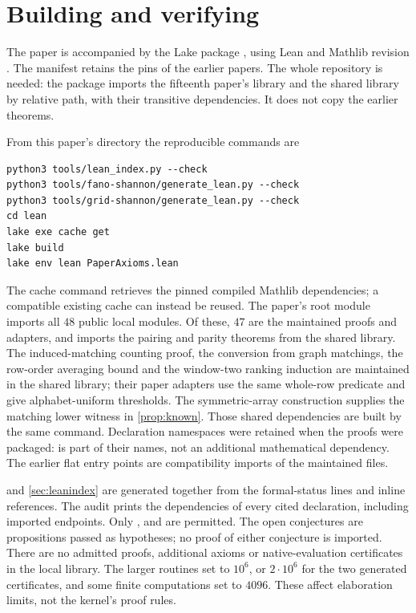 \section{Building and verifying}\label{sec:verification}

The paper is accompanied by the Lake package , using Lean
 and Mathlib revision
. The manifest retains the pins of the earlier papers. The whole
repository is needed: the package imports the fifteenth paper's library and the shared 
library by relative path, with their transitive dependencies. It does not copy the earlier theorems.

From this paper's directory the reproducible commands are
\begin{verbatim}
python3 tools/lean_index.py --check
python3 tools/fano-shannon/generate_lean.py --check
python3 tools/grid-shannon/generate_lean.py --check
cd lean
lake exe cache get
lake build
lake env lean PaperAxioms.lean
\end{verbatim}
The cache command retrieves the pinned compiled Mathlib dependencies; a compatible existing cache can instead be
reused. The paper's root module imports all $48$ public local modules. Of these, $47$ are the maintained proofs and
adapters, and  imports the pairing and parity theorems from the shared library.
The induced-matching counting proof, the conversion from graph matchings, the row-order averaging bound and
the window-two ranking induction are maintained in the shared library; their paper adapters use the same
whole-row predicate and give alphabet-uniform thresholds. The symmetric-array construction supplies the matching
lower witness in \cref{prop:known}. Those shared dependencies are built by the same command. Declaration namespaces were retained when the proofs were
packaged:  is part of their names, not an additional mathematical dependency. The earlier flat
entry points are compatibility imports of the maintained files.

 and \cref{sec:leanindex} are generated together from the formal-status lines and inline
references. The audit prints the dependencies of every cited declaration, including imported endpoints. Only
,  and  are permitted. The open conjectures are
propositions passed as hypotheses; no proof of either conjecture is imported. There are no admitted proofs,
additional axioms or native-evaluation certificates in the local library. The larger routines set
 to $10^6$, or $2\cdot10^6$ for the two generated certificates, and some finite computations
set  to $4096$. These affect elaboration limits, not the kernel's proof rules.

